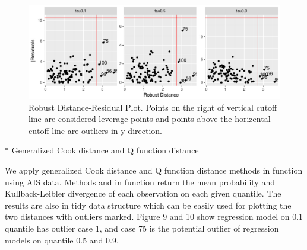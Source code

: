 \documentclass[article]{jss}
\theoremstyle{definition}
\theoremstyle{definition}
\theoremstyle{remark}
\begin{document}
\begin{CodeChunk}

\begin{figure}

{\centering \includegraphics{Diagnosing_outliers_and_visualization_of_quantile_regression_models_files/figure-latex/unnamed-chunk-4-1} 

}

\caption[Robust Distance-Residual Plot]{Robust Distance-Residual Plot. Points on the right of vertical cutoff line are considered leverage points and points above the horizental cutoff line are outliers in y-direction.}\label{fig:unnamed-chunk-4}
\end{figure}
\end{CodeChunk}

* Generalized Cook distance and Q function distance

We apply generalized Cook distance and Q function distance methods in function  using AIS data. Methods  and  in function  return the mean probability and Kullback-Leibler divergence of each observation on each given quantile. The results are also in tidy data structure which can be easily used for plotting the two distances with outliers marked. Figure 9 and 10 show regression model on 0.1 quantile has outlier case 1, and case 75 is the potential outlier of regression models on quantile 0.5 and 0.9. 
\end{document}
